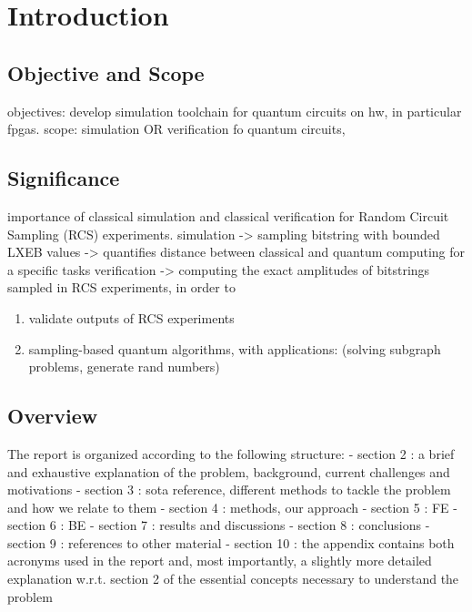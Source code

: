 \documentclass[12pt,oneside,a4paper]{article}
\begin{document}
\tableofcontents
\newpage

\section{Introduction}

\subsection{Objective and Scope}
objectives: develop simulation toolchain for quantum circuits on hw, in particular fpgas.
scope: simulation OR verification fo quantum circuits,

\subsection{Significance}
importance of classical simulation and classical verification for Random Circuit Sampling (RCS) experiments.
simulation -> sampling bitstring with bounded LXEB values -> quantifies distance between classical and quantum computing for a specific tasks
verification -> computing the exact amplitudes of bitstrings sampled in RCS experiments, in order to
\begin{enumerate}
	\item validate outputs of RCS experiments
	\item sampling-based quantum algorithms, with applications: (solving subgraph problems, generate rand numbers)
\end{enumerate}



\subsection{Overview}
The report is organized according to the following structure:
- section 2 : a brief and exhaustive explanation of the problem, background, current challenges and motivations
- section 3 : sota reference, different methods to tackle the problem and how we relate to them
- section 4 : methods, our approach
- section 5 : FE
- section 6 : BE
- section 7 : results and discussions
- section 8 : conclusions
- section 9 : references to other material
- section 10 : the appendix contains both acronyms used in the report and, most importantly, a slightly more detailed explanation w.r.t. section 2 of the essential concepts necessary to understand the problem
\end{document}
